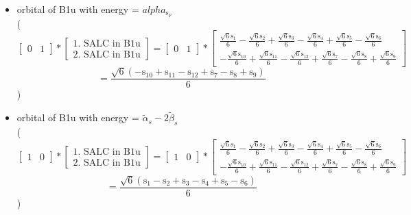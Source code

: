\documentclass[12pt,a4paper]{article}
\begin{document}
\begin{itemize}
\textcolor{red}{Error in Orthogonalization of SALCs}\item orbital of B1u with energy = 
                                $alpha_{\text{s}_F}$ \\
( 
$$
\left[\begin{matrix}0 & 1\end{matrix}\right] * \left[\begin{array}{c}\text{1. SALC in B1u} \\ \text{2. SALC in B1u}\end{array}\right] = \left[\begin{matrix}0 & 1\end{matrix}\right] * \left[\begin{matrix}\frac{\sqrt{6} \text{s}_{1}}{6} - \frac{\sqrt{6} \text{s}_{2}}{6} + \frac{\sqrt{6} \text{s}_{3}}{6} - \frac{\sqrt{6} \text{s}_{4}}{6} + \frac{\sqrt{6} \text{s}_{5}}{6} - \frac{\sqrt{6} \text{s}_{6}}{6}\\- \frac{\sqrt{6} \text{s}_{10}}{6} + \frac{\sqrt{6} \text{s}_{11}}{6} - \frac{\sqrt{6} \text{s}_{12}}{6} + \frac{\sqrt{6} \text{s}_{7}}{6} - \frac{\sqrt{6} \text{s}_{8}}{6} + \frac{\sqrt{6} \text{s}_{9}}{6}\end{matrix}\right] 
 $$ $$ = \frac{\sqrt{6} \left(- \text{s}_{10} + \text{s}_{11} - \text{s}_{12} + \text{s}_{7} - \text{s}_{8} + \text{s}_{9}\right)}{6} 
 $$ 
 )

\item orbital of B1u with energy = 
                                $\tilde{\alpha}_{s} - 2 \tilde{\beta}_{s}$ \\
( 
$$
\left[\begin{matrix}1 & 0\end{matrix}\right] * \left[\begin{array}{c}\text{1. SALC in B1u} \\ \text{2. SALC in B1u}\end{array}\right] = \left[\begin{matrix}1 & 0\end{matrix}\right] * \left[\begin{matrix}\frac{\sqrt{6} \text{s}_{1}}{6} - \frac{\sqrt{6} \text{s}_{2}}{6} + \frac{\sqrt{6} \text{s}_{3}}{6} - \frac{\sqrt{6} \text{s}_{4}}{6} + \frac{\sqrt{6} \text{s}_{5}}{6} - \frac{\sqrt{6} \text{s}_{6}}{6}\\- \frac{\sqrt{6} \text{s}_{10}}{6} + \frac{\sqrt{6} \text{s}_{11}}{6} - \frac{\sqrt{6} \text{s}_{12}}{6} + \frac{\sqrt{6} \text{s}_{7}}{6} - \frac{\sqrt{6} \text{s}_{8}}{6} + \frac{\sqrt{6} \text{s}_{9}}{6}\end{matrix}\right] 
 $$ $$ = \frac{\sqrt{6} \left(\text{s}_{1} - \text{s}_{2} + \text{s}_{3} - \text{s}_{4} + \text{s}_{5} - \text{s}_{6}\right)}{6} 
 $$ 
 )

\end{itemize}
\end{document}
